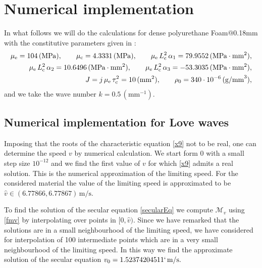\documentclass[10pt]{article}
\begin{document}
 
\section{Numerical implementation}\label{Num1}\setcounter{equation}{0}


In what follows we will do the calculations for dense polyurethane  {Foam@0.18mm} with the constitutive parameters given in \cite{Lakes83,lakes1987foam}:
\begin{align}\label{numcoef1}
\mu_{\rm e}=104 \,\text{(MPa)},\qquad \mu_{\rm c}=4.3331  \,\text{(MPa)}, \qquad {\mu_{\rm e}\,L_{\rm c}^2}\,\alpha_1=79.9552 \,(\text{MPa}\cdot \text{mm}^2), \notag\vspace{2mm}\\ {\mu_{\rm e}\,L_{\rm c}^2}\,\alpha_2=10.6496 \,(\text{MPa}\cdot \text{mm}^2), \qquad {\mu_{\rm e}\,L_{\rm c}^2}\,\alpha_3= -53.3035 \,(\text{MPa}\cdot \text{mm}^2), \vspace{2mm}\\
J=j\,\mu_{\rm e}\,\tau_{\rm c}^2= 10 \,(\text{mm}^2),\qquad \rho_0=340\cdot 10^{-6} \,{(\text{g/mm}^3)},\notag
\end{align}
and we take the wave number $k=0.5 \,(\text{mm}^{-1}).$

\subsection{Numerical implementation for Love waves}\label{NumLove}

Imposing that the roots  of the characteristic equation \eqref{x9} not to be real, one can determine the speed $v$ by numerical calculation. We start form $0$ with a small step  {size} $10^{-12}$ and we find the first value of $v$ for which \eqref{x9} admits a real solution. This is the numerical approximation of the limiting speed. For the considered material the value of the limiting speed is approximated to be   $\widehat{v}\in (6.77866,6.77867)\,\text{m/s}$.   

To find the solution of the secular equation \eqref{secularEq} we compute $  \boldsymbol{\mathcal{M}}_v$ using \eqref{fmv} by interpolating over points in  $[0, \widehat{v})$. Since we have remarked that the solutions  {are} in a small  {neighbourhood} of the limiting speed,  {we have considered for interpolation of 100 intermediate points} which are in a very small neighbourhood of the limiting speed. In this way we find the approximate solution of the secular equation $v_0=1.52374204511`\,\text{m/s}.$
\end{document}
